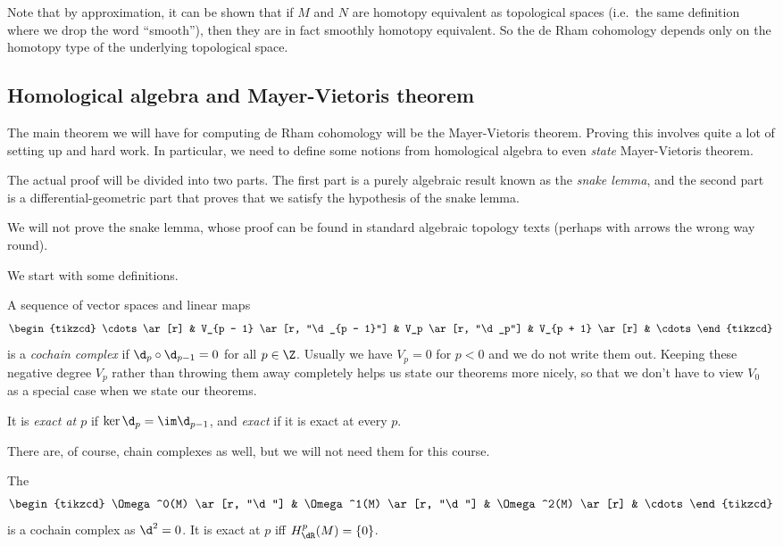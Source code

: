\documentclass[a4paper]{article}
\begin{document}
Note that by approximation, it can be shown that if $M$ and $N$ are homotopy equivalent as topological spaces (i.e.\ the same definition where we drop the word ``smooth''), then they are in fact smoothly homotopy equivalent. So the de Rham cohomology depends only on the homotopy type of the underlying topological space.

\subsection{Homological algebra and Mayer-Vietoris theorem}
The main theorem we will have for computing de Rham cohomology will be the Mayer-Vietoris theorem. Proving this involves quite a lot of setting up and hard work. In particular, we need to define some notions from homological algebra to even \emph{state} Mayer-Vietoris theorem.

The actual proof will be divided into two parts. The first part is a purely algebraic result known as the \emph{snake lemma}, and the second part is a differential-geometric part that proves that we satisfy the hypothesis of the snake lemma.

We will not prove the snake lemma, whose proof can be found in standard algebraic topology texts (perhaps with arrows the wrong way round). %

We start with some definitions.
\begin{defi}
  A sequence of vector spaces and linear maps
  \[
    \begin{tikzcd}
      \cdots \ar[r] & V_{p - 1} \ar[r, "\d_{p - 1}"] & V_p \ar[r, "\d_p"] & V_{p + 1} \ar[r] & \cdots
    \end{tikzcd}
  \]
  is a \emph{cochain complex} if $\d_p \circ \d_{p - 1} = 0$ for all $p \in \Z$. Usually we have $V_p = 0$ for $p < 0$ and we do not write them out. Keeping these negative degree $V_p$ rather than throwing them away completely helps us state our theorems more nicely, so that we don't have to view $V_0$ as a special case when we state our theorems.

  It is \emph{exact at $p$} if $\ker \d_p = \im \d_{p - 1}$, and \emph{exact} if it is exact at every $p$.
\end{defi}
There are, of course, chain complexes as well, but we will not need them for this course.

\begin{eg}
  The 
  \[
    \begin{tikzcd}
      \Omega^0(M) \ar[r, "\d"] & \Omega^1(M) \ar[r, "\d"] & \Omega^2(M) \ar[r] & \cdots
    \end{tikzcd}
  \]
  is a cochain complex as $\d^2 = 0$. It is exact at $p$ iff $H_{\dR}^p(M) = \{0\}$.
\end{eg}
\end{document}
